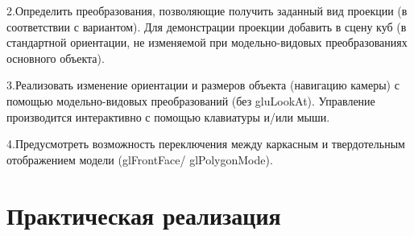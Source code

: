 \documentclass[a4paper, 14pt]{extarticle}
\begin{document}
2.Определить преобразования, позволяющие получить заданный вид проекции (в
соответствии с вариантом). Для демонстрации проекции добавить в сцену куб (в стандартной
ориентации, не изменяемой при модельно-видовых преобразованиях основного объекта).

3.Реализовать изменение ориентации и размеров объекта (навигацию камеры) с помощью
модельно-видовых преобразований (без gluLookAt). Управление производится интерактивно с
помощью клавиатуры и/или мыши.

4.Предусмотреть возможность переключения между каркасным и твердотельным
отображением модели (glFrontFace/ glPolygonMode).


\pagebreak
\section{Практическая реализация}
\end{document}
